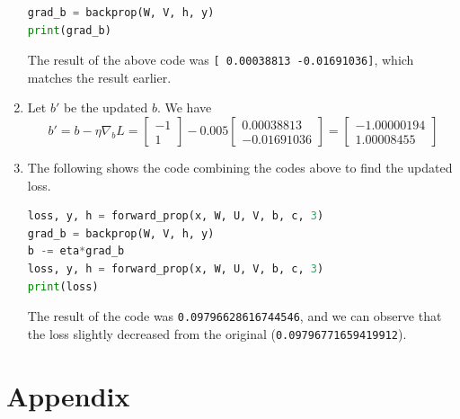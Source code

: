\documentclass[
	12pt, %
]{../Template/fphw}
\begin{document}
\begin{enumerate}[label=(\arabic*)]
\begin{lstlisting}[language=Python]
grad_b = backprop(W, V, h, y)
print(grad_b)
    \end{lstlisting}
    The result of the above code was \verb|[ 0.00038813 -0.01691036]|, which matches the result earlier.
    \item Let $b'$ be the updated $b$. We have
    \begin{equation}
        b' = b - \eta \nabla_{b}L = \begin{bmatrix}
            -1 \\ 1
        \end{bmatrix} - 0.005 \begin{bmatrix}
             0.00038813\\ -0.01691036
        \end{bmatrix} = \begin{bmatrix}
            -1.00000194 \\ 1.00008455
        \end{bmatrix}
    \end{equation}
    \item The following shows the code combining the codes above to find the updated loss.
    \begin{lstlisting}[language=Python]
loss, y, h = forward_prop(x, W, U, V, b, c, 3)
grad_b = backprop(W, V, h, y)
b -= eta*grad_b
loss, y, h = forward_prop(x, W, U, V, b, c, 3)
print(loss)
    \end{lstlisting}
    The result of the code was \verb|0.09796628616744546|, and we can observe that the loss slightly decreased from the original (\verb|0.09796771659419912|).
\end{enumerate}

\section*{Appendix}
\end{document}
